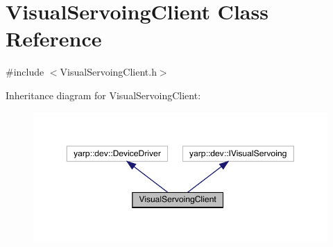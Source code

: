 \hypertarget{classVisualServoingClient}{}\section{Visual\+Servoing\+Client Class Reference}
\label{classVisualServoingClient}


{\ttfamily \#include $<$Visual\+Servoing\+Client.\+h$>$}



Inheritance diagram for Visual\+Servoing\+Client\+:
\nopagebreak
\begin{figure}[H]
\begin{center}
\leavevmode
\includegraphics[width=350pt]{classVisualServoingClient__inherit__graph}
\end{center}
\end{figure}
